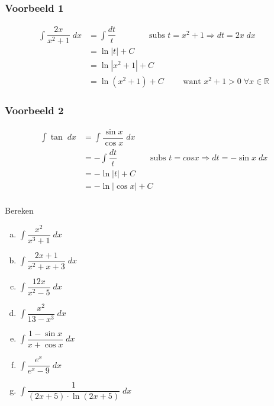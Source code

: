 \documentclass[a4paper,12pt, twoside]{article}
\begin{document}
\subsubsection*{Voorbeeld 1}
\begin{align*}
  \int \dfrac{2x}{x^2+1} \;dx
  &= \int \dfrac{dt}{t} \qquad\qquad\mbox{subs }t=x^2+1 \Rightarrow dt = 2x\;dx\\
  &= \ln |t| +C\\
  &= \ln |x^2+1| + C\\
  &= \ln(x^2+1) + C \qquad \mbox{ want } x^2+1 > 0 \;  \forall x \in \mathbb{R}
\end{align*}

\subsubsection*{Voorbeeld 2}
\begin{align*}
  \int \tan \;dx &= \int \dfrac{\sin x}{\cos x} \;dx\\
  &= - \int \dfrac{dt}{t} \qquad\qquad\mbox{subs }t=cos x \Rightarrow dt = -\sin x\;dx\\
  &= - \ln |t| +C\\
  &= - \ln |\cos x| + C\\
\end{align*}

\begin{oefening}
  Bereken
  \begin{multicols}{2}
  \begin{enumerate}[(a)]
  \item $\displaystyle\int \dfrac{x^2}{x^3+1} \;dx$
  \item $\displaystyle\int \dfrac{2x+1}{x^2+x+3} \;dx$
  \item $\displaystyle\int \dfrac{12x}{x^2-5} \;dx$
  \item $\displaystyle\int \dfrac{x^2}{13-x^3} \;dx$
  \item $\displaystyle\int \dfrac{1-\sin x}{x+\cos x} \;dx$
  \item $\displaystyle\int \dfrac{e^x}{e^x-9} \;dx$
  \item $\displaystyle\int \dfrac{1}{(2x+5) \cdot \ln(2x+5)} \;dx$
  \end{enumerate}
\end{multicols}
\end{oefening}
\end{document}
